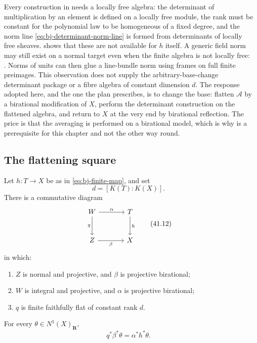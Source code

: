 \begin{remark}
\label{rem:ch41-why-flat}
Every construction in  needs a locally free
algebra: the determinant of multiplication by an element is defined on a
locally free module, the rank must be constant for the polynomial law to be
homogeneous of a fixed degree, and the norm line
\eqref{eq:bj-determinant-norm-line} is formed from determinants of
locally free sheaves.   shows that these are not
available for $h$ itself.  A generic field norm may still exist on a normal target even when
the finite algebra is not locally free:
\cite[\href{https://stacks.math.columbia.edu/tag/0BD3}{Tag 0BD3}]
{stacks-project}.  Norms of units can then glue a line-bundle norm
using frames on full finite preimages.  This observation does not
supply the arbitrary-base-change determinant package or a fibre
algebra of constant dimension $d$.
The response adopted here, and the one
the plan prescribes, is to change the base: flatten $\mathcal A$ by a
birational modification of $X$, perform the determinant construction on
the flattened algebra, and return to $X$ at the very end by birational
reflection.  The price is that the averaging is performed on a birational
model, which is why  is a prerequisite for this
chapter and not the other way round.
\end{remark}

\subsection{The flattening square}
\label{sec:ch41-flatification}

\begin{lemma}\label{lem:bj-finite-flatification}
Let $h:T\to X$ be as in \eqref{eq:bj-finite-map}, and set
\[
                              d=[K(T):K(X)].
\]
There is a commutative diagram
\[
\begin{tikzcd}[column sep=large,row sep=large]
W \arrow[r,"\alpha"] \arrow[d,"q"'] &
T \arrow[d,"h"]\\
Z \arrow[r,"\beta"'] &
X
\end{tikzcd}
\tag{41.12}\label{eq:bj-flatification-square}
\]
in which:
\begin{enumerate}
\item $Z$ is normal and projective, and $\beta$ is projective
      birational;
\item $W$ is integral and projective, and $\alpha$ is projective
      birational;
\item $q$ is finite faithfully flat of constant rank $d$.
\end{enumerate}
For every $\theta\in N^1(X)_{\mathbf R}$,
\[
                         q^*\beta^*\theta=\alpha^*h^*\theta.
\tag{41.13}\label{eq:bj-flatification-class}
\]
\end{lemma}

